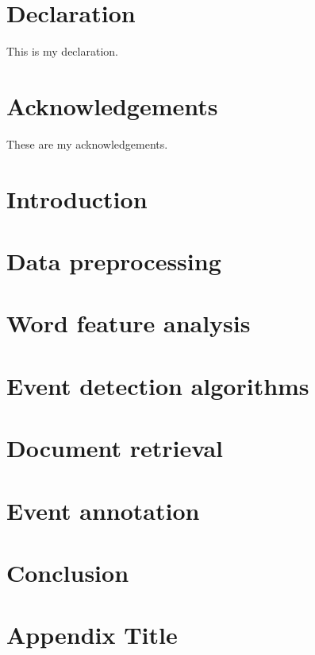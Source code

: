 \documentclass[12pt,twoside]{report}
\begin{document}






\chapter*{Declaration}
This is my declaration.


\chapter*{Acknowledgements}
These are my acknowledgements.


\tableofcontents
\listoffigures
\listofalgorithms


\chapter{Introduction}


\chapter{Data preprocessing}


\chapter{Word feature analysis}


\chapter{Event detection algorithms}


\chapter{Document retrieval}


\chapter{Event annotation}


\chapter{Conclusion}



\appendix
\chapter{Appendix Title}



\printbibliography
\end{document}

